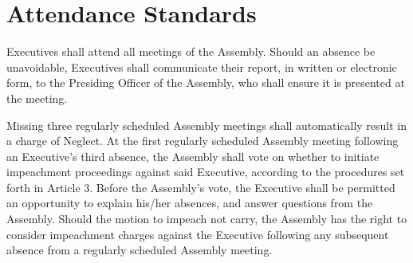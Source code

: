 \section{Attendance Standards}
\begin{bylaws-number}
  \item Executives shall attend all meetings of the Assembly. Should an absence be unavoidable, Executives shall communicate their report, in written or electronic form, to the Presiding Officer of the Assembly, who shall ensure it is presented at the meeting.
  \item Missing three regularly scheduled Assembly meetings shall automatically result in a charge of Neglect. At the first regularly scheduled Assembly meeting following an Executive’s third absence, the Assembly shall vote on whether to initiate impeachment proceedings against said Executive, according to the procedures set forth in Article 3. Before the Assembly’s vote, the Executive shall be permitted an opportunity to explain his/her absences, and answer questions from the Assembly. Should the motion to impeach not carry, the Assembly has the right to consider impeachment charges against the Executive following any subsequent absence from a regularly scheduled Assembly meeting.
\end{bylaws-number}